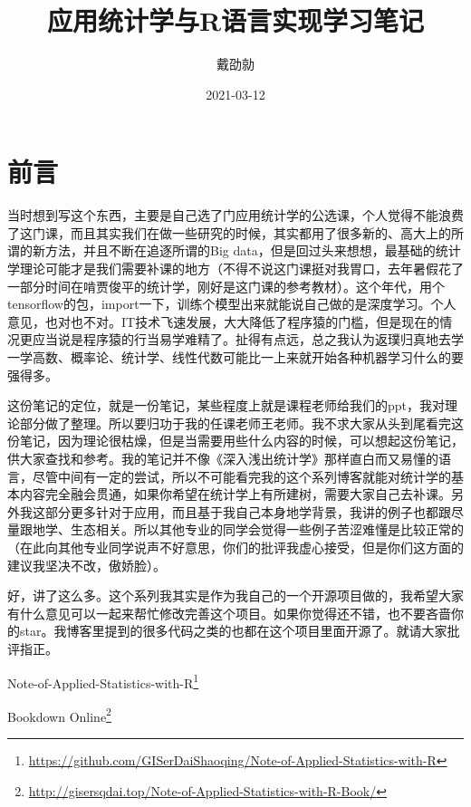 \documentclass[]{ctexbook}
\title{应用统计学与R语言实现学习笔记}
\author{戴劭勍}
\date{2021-03-12}
\renewcommand{\href}[2]{#2\footnote{\url{#1}}}
\begin{document}
\maketitle


\thispagestyle{empty}



\setlength{\abovedisplayskip}{-5pt}
\setlength{\abovedisplayshortskip}{-5pt}

{
\setcounter{tocdepth}{2}
\tableofcontents
}
\hypertarget{ux524dux8a00}{%
\chapter*{前言}\label{ux524dux8a00}}


当时想到写这个东西，主要是自己选了门应用统计学的公选课，个人觉得不能浪费了这门课，而且其实我们在做一些研究的时候，其实都用了很多新的、高大上的所谓的新方法，并且不断在追逐所谓的Big data，但是回过头来想想，最基础的统计学理论可能才是我们需要补课的地方（不得不说这门课挺对我胃口，去年暑假花了一部分时间在啃贾俊平的统计学，刚好是这门课的参考教材）。这个年代，用个tensorflow的包，import一下，训练个模型出来就能说自己做的是深度学习。个人意见，也对也不对。IT技术飞速发展，大大降低了程序猿的门槛，但是现在的情况更应当说是程序猿的行当易学难精了。扯得有点远，总之我认为返璞归真地去学一学高数、概率论、统计学、线性代数可能比一上来就开始各种机器学习什么的要强得多。

这份笔记的定位，就是一份笔记，某些程度上就是课程老师给我们的ppt，我对理论部分做了整理。所以要归功于我的任课老师王老师。我不求大家从头到尾看完这份笔记，因为理论很枯燥，但是当需要用些什么内容的时候，可以想起这份笔记，供大家查找和参考。我的笔记并不像《深入浅出统计学》那样直白而又易懂的语言，尽管中间有一定的尝试，所以不可能看完我的这个系列博客就能对统计学的基本内容完全融会贯通，如果你希望在统计学上有所建树，需要大家自己去补课。另外我这部分更多针对于应用，而且基于我自己本身地学背景，我讲的例子也都跟尽量跟地学、生态相关。所以其他专业的同学会觉得一些例子苦涩难懂是比较正常的（在此向其他专业同学说声不好意思，你们的批评我虚心接受，但是你们这方面的建议我坚决不改，傲娇脸）。

好，讲了这么多。这个系列我其实是作为我自己的一个开源项目做的，我希望大家有什么意见可以一起来帮忙修改完善这个项目。如果你觉得还不错，也不要吝啬你的star。我博客里提到的很多代码之类的也都在这个项目里面开源了。就请大家批评指正。

\href{https://github.com/GISerDaiShaoqing/Note-of-Applied-Statistics-with-R}{Note-of-Applied-Statistics-with-R}

\href{http://gisersqdai.top/Note-of-Applied-Statistics-with-R-Book/}{Bookdown Online}
\end{document}
